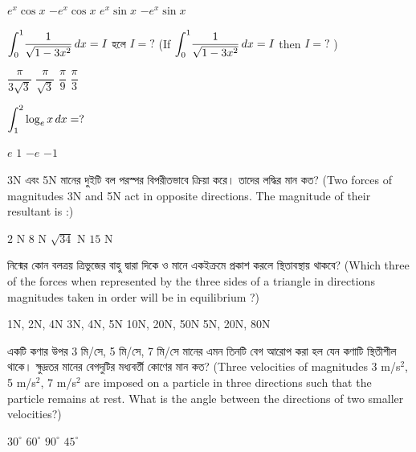 \documentclass[addpoints]{exam}
\begin{document}
\begin{questions}
\begin{oneparchoices}
\choice $ e^{x}\cos x $
\choice $ -e^{x}\cos x $
\choice $ e^{x}\sin x $
\choice $ -e^{x}\sin x $
\end{oneparchoices}

\question $ \mathlarger{\int_{0}^{1}}\dfrac{1}{\sqrt{1-3x^{2}}}\,dx = I $ হলে $ I=? $ (If $ \mathlarger{\int_{0}^{1}}\dfrac{1}{\sqrt{1-3x^{2}}}\,dx = I $ then $ I=? $ )

\begin{oneparchoices}
\choice  $ \dfrac{\pi}{3\sqrt{3}} $
\choice  $ \dfrac{\pi}{\sqrt{3}} $
\choice  $ \dfrac{\pi}{9} $
\choice  $ \dfrac{\pi}{3} $
\end{oneparchoices}



\question  $ \mathlarger{\int_{1}^{2}\log_{e}x\, dx = ?} $

\begin{oneparchoices}
\choice $ e $
\choice $ 1 $
\choice $ -e $
\choice $ -1 $
\end{oneparchoices}

\question 3N এবং 5N মানের দুইটি বল পরস্পর বিপরীতভাবে ক্রিয়া করে। তাদের লদ্ধির মান কত? (Two forces of magnitudes 3N and 5N act in opposite directions.  The magnitude of their resultant is :) 

\begin{oneparchoices}
\choice $ 2 $ N
\choice $ 8 $ N
\choice $ \sqrt{34} $ N
\choice $ 15 $ N  
\end{oneparchoices}


\question নিন্মের কোন বলত্রয় ত্রিভুজের বাহু দ্বারা দিকে ও মানে একইক্রমে প্রকাশ করলে স্থিতাবস্থায় থাকবে? (Which three of the forces when represented by the three sides of a triangle in directions magnitudes taken in order will be in equilibrium ?)


\begin{oneparchoices}
\choice 1N, 2N, 4N
\choice 3N, 4N, 5N
\choice 10N, 20N, 50N
\choice  5N, 20N, 80N
\end{oneparchoices}


\question একটি কণার উপর 3 মি/সে, 5 মি/সে, 7 মি/সে মানের এমন তিনটি বেগ আরোপ করা হল যেন কণাটি স্থিতীশীল থাকে। ক্ষুদ্রতর মানের বেগদুটির মধ্যবর্তী কোণের মান কত? (Three velocities of magnitudes 3 m/s$ ^{2} $, 5 m/s$ ^{2} $, 7 m/s$ ^{2} $ are imposed on a particle in three directions such that the particle remains at rest. What is the angle between the directions of two smaller velocities?)

\begin{oneparchoices}
\choice  $ 30^{\circ} $
\choice  $ 60^{\circ} $
\choice  $ 90^{\circ} $
\choice  $ 45^{\circ} $
\end{oneparchoices}


\end{questions}
\end{document}
